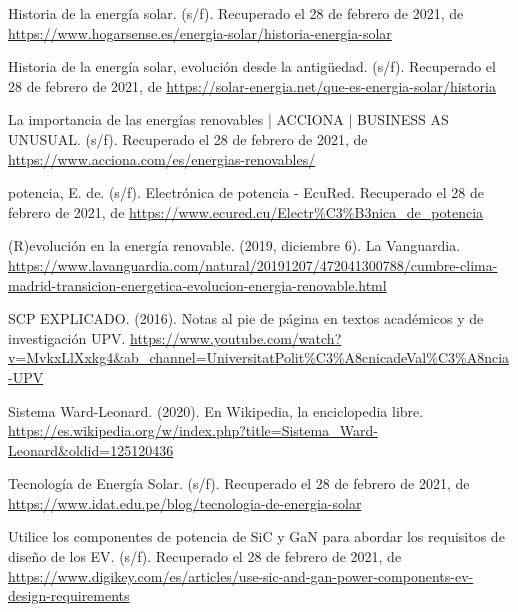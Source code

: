\documentclass[12pt,letterpaper,superscriptaddress]{article}
\begin{document}
\begin{thebibliography}{99}
	\bibitem{} Historia de la energía solar. (s/f). Recuperado el 28 de febrero de 2021, de \url{https://www.hogarsense.es/energia-solar/historia-energia-solar}
	
	\bibitem{} Historia de la energía solar, evolución desde la antigüedad. (s/f). Recuperado el 28 de febrero de 2021, de \url{https://solar-energia.net/que-es-energia-solar/historia}
	
	\bibitem{} La importancia de las energías renovables | ACCIONA | BUSINESS AS UNUSUAL. (s/f). Recuperado el 28 de febrero de 2021, de \url{https://www.acciona.com/es/energias-renovables/}
	
	\bibitem{} potencia, E. de. (s/f). Electrónica de potencia - EcuRed. Recuperado el 28 de febrero de 2021, de \url{https://www.ecured.cu/Electr\%C3\%B3nica_de_potencia}
	
	\bibitem{} (R)evolución en la energía renovable. (2019, diciembre 6). La Vanguardia. \url{https://www.lavanguardia.com/natural/20191207/472041300788/cumbre-clima-madrid-transicion-energetica-evolucion-energia-renovable.html}
	
	\bibitem{} SCP EXPLICADO. (2016). Notas al pie de página en textos académicos y de investigación UPV. \url{https://www.youtube.com/watch?v=MvkxLlXxkg4&ab_channel=UniversitatPolit\%C3\%A8cnicadeVal\%C3\%A8ncia-UPV}
	
	\bibitem{} Sistema Ward-Leonard. (2020). En Wikipedia, la enciclopedia libre. \url{https://es.wikipedia.org/w/index.php?title=Sistema_Ward-Leonard&oldid=125120436}
	
	\bibitem{} Tecnología de Energía Solar. (s/f). Recuperado el 28 de febrero de 2021, de \url{https://www.idat.edu.pe/blog/tecnologia-de-energia-solar}
	
	\bibitem{} Utilice los componentes de potencia de SiC y GaN para abordar los requisitos de diseño de los EV. (s/f). Recuperado el 28 de febrero de 2021, de \url{https://www.digikey.com/es/articles/use-sic-and-gan-power-components-ev-design-requirements}

\end{thebibliography}
\end{document}
